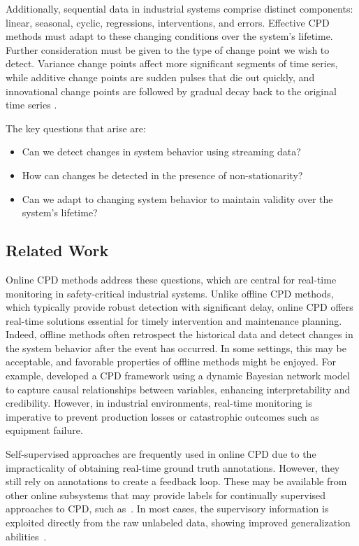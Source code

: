 Additionally, sequential data in industrial systems comprise distinct components: linear, seasonal, cyclic, regressions, interventions, and errors. Effective CPD methods must adapt to these changing conditions over the system's lifetime. Further consideration must be given to the type of change point we wish to detect. Variance change points affect more significant segments of time series, while additive change points are sudden pulses that die out quickly, and innovational change points are followed by gradual decay back to the original time series \citep{Srivastava2017}.

The key questions that arise are:
\begin{itemize}
	\item Can we detect changes in system behavior using streaming data?
	\item How can changes be detected in the presence of non-stationarity?
	\item Can we adapt to changing system behavior to maintain validity over the system's lifetime?
\end{itemize}

\subsection{Related Work}
Online CPD methods address these questions, which are central for real-time monitoring in safety-critical industrial systems. Unlike offline CPD methods, which typically provide robust detection with significant delay, online CPD offers real-time solutions essential for timely intervention and maintenance planning. Indeed, offline methods often retrospect the historical data and detect changes in the system behavior after the event has occurred. In some settings, this may be acceptable, and favorable properties of offline methods might be enjoyed. For example, \citet{Liu2022} developed a CPD framework using a dynamic Bayesian network model to capture causal relationships between variables, enhancing interpretability and credibility. However, in industrial environments, real-time monitoring is imperative to prevent production losses or catastrophic outcomes such as equipment failure.

Self-supervised approaches are frequently used in online CPD due to the impracticality of obtaining real-time ground truth annotations. However, they still rely on annotations to create a feedback loop. These may be available from other online subsystems that may provide labels for continually supervised approaches to CPD, such as~\cite{Korycki2021}. In most cases, the supervisory information is exploited directly from the raw unlabeled data, showing improved generalization abilities~\citep{Zhang2024}.  %

